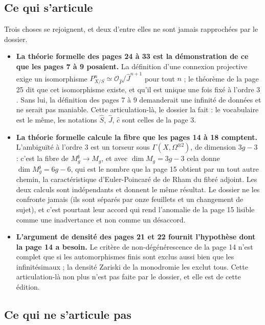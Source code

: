\documentclass[11pt,a4paper]{article}
\begin{document}
\subsection*{Ce qui s'articule}

Trois choses se rejoignent, et deux d'entre elles ne sont jamais rapprochées
par le dossier.

\begin{itemize}
\item \textbf{La théorie formelle des pages 24 à 33 est la démonstration de ce
que les pages 7 à 9 posaient.} La définition d'une connexion projective exige
un isomorphisme $P^n_{X/S} \simeq \mathcal{O}_{\widehat{P}}/\widehat{J}^{n+1}$
pour tout $n$ ; le théorème de la page 25 dit que cet isomorphisme existe, et
qu'il est unique une fois fixé à l'ordre $3$. Sans lui, la définition des
pages 7 à 9 demanderait une infinité de données et ne serait pas maniable.
Cette articulation-là, le dossier la fait : le vocabulaire est le même, les
notations $\widehat{S}$, $\widehat{J}$, $\widehat{c}$ sont celles de la
page 3.
\item \textbf{La théorie formelle calcule la fibre que les pages 14 à 18
comptent.} L'ambiguïté à l'ordre $3$ est un torseur sous
$\Gamma(X,\Omega^{\otimes 2})$, de dimension $3g-3$ : c'est la
fibre de $M_g^{\mathfrak{z}} \to M_g$, et avec $\dim M_g = 3g-3$ cela donne
$\dim M_g^{\mathfrak{z}} = 6g-6$, qui est le nombre que la page 15 obtient par
un tout autre chemin, la caractéristique d'Euler-Poincaré de de Rham du fibré
adjoint. Les deux calculs sont indépendants et donnent le même résultat. Le
dossier ne les confronte jamais (ils sont séparés par onze feuillets et un
changement de sujet), et c'est pourtant leur accord qui rend l'anomalie de la page 15
lisible comme une inadvertance et non comme un désaccord.
\item \textbf{L'argument de densité des pages 21 et 22 fournit l'hypothèse
dont la page 14 a besoin.} Le critère de non-dégénérescence de la page 14
n'est complet que si les automorphismes finis sont exclus aussi bien que les
infinitésimaux ; la densité Zariski de la monodromie les exclut tous. Cette
articulation-là non plus n'est pas faite par le dossier, et elle est de cette
édition.
\end{itemize}

\subsection*{Ce qui ne s'articule pas}
\end{document}
